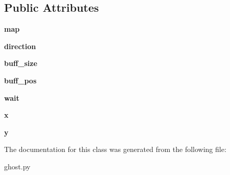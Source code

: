 \subsection*{Public Attributes}
\begin{DoxyCompactItemize}
\item 
\mbox{\label{classghost_1_1_ghost_ac8e98acb0ae62b0ff59955dcbe912030}} 
{\bfseries map}
\item 
\mbox{\label{classghost_1_1_ghost_a7ffe8bd2ad8bf59393b0dd3710ca7a8f}} 
{\bfseries direction}
\item 
\mbox{\label{classghost_1_1_ghost_ae74450f27e6fa1661f9a95022f664787}} 
{\bfseries buff\+\_\+size}
\item 
\mbox{\label{classghost_1_1_ghost_a63796aad535c4e2a7a6324d441e5eac3}} 
{\bfseries buff\+\_\+pos}
\item 
\mbox{\label{classghost_1_1_ghost_a7d7dfe18e242e186b6a67d1d17c05653}} 
{\bfseries wait}
\item 
\mbox{\label{classghost_1_1_ghost_a499ab1df70189538dee9046e0d3aa6df}} 
{\bfseries x}
\item 
\mbox{\label{classghost_1_1_ghost_a7fda5d1891557a09b2b5b3257ab191f4}} 
{\bfseries y}
\end{DoxyCompactItemize}


The documentation for this class was generated from the following file\+:\begin{DoxyCompactItemize}
\item 
ghost.\+py\end{DoxyCompactItemize}
